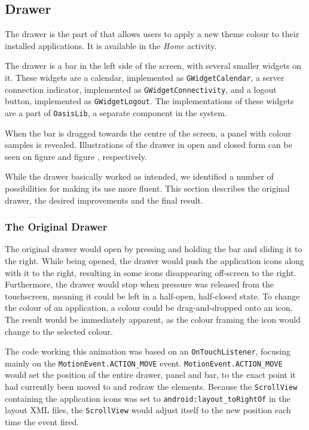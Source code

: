 \subsection{Drawer}
The drawer is the part of \launcher that allows users to apply a new theme colour to their installed \giraf applications.
It is available in the \textit{Home} activity.

The drawer is a bar in the left side of the screen, with several smaller widgets on it.
These widgets are a calendar, implemented as \lstinline{GWidgetCalendar}, a server connection indicator, implemented as \lstinline{GWidgetConnectivity}, and a logout button, implemented as \lstinline{GWidgetLogout}.
The implementations of these widgets are a part of \lstinline{OasisLib}, a separate component in the \giraf system.

When the bar is dragged towards the centre of the screen, a panel with colour samples is revealed.
Illustrations of the drawer in open and closed form can be seen on figure  and figure , respectively.

While the drawer basically worked as intended, we identified a number of possibilities for making its use more fluent.
This section describes the original drawer, the desired improvements and the final result.

\subsubsection{The Original Drawer}

The original drawer would open by pressing and holding the bar and sliding it to the right.
While being opened, the drawer would push the application icons along with it to the right, resulting in some icons disappearing off-screen to the right.
Furthermore, the drawer would stop when pressure was released from the touchscreen, meaning it could be left in a half-open, half-closed state.
To change the colour of an application, a colour could be drag-and-dropped onto an icon. The result would be immediately apparent, as the colour framing the icon would change to the selected colour.

The code working this animation was based on an \lstinline{OnTouchListener}, focusing mainly on the \lstinline{MotionEvent.ACTION_MOVE} event.
\lstinline{MotionEvent.ACTION_MOVE} would set the position of the entire drawer, panel and bar, to the exact point it had currently been moved to and redraw the elements.
Because the \lstinline{ScrollView} containing the application icons was set to \lstinline{android:layout_toRightOf} in the layout XML files, the \lstinline{ScrollView} would adjust itself to the new position each time the event fired.

